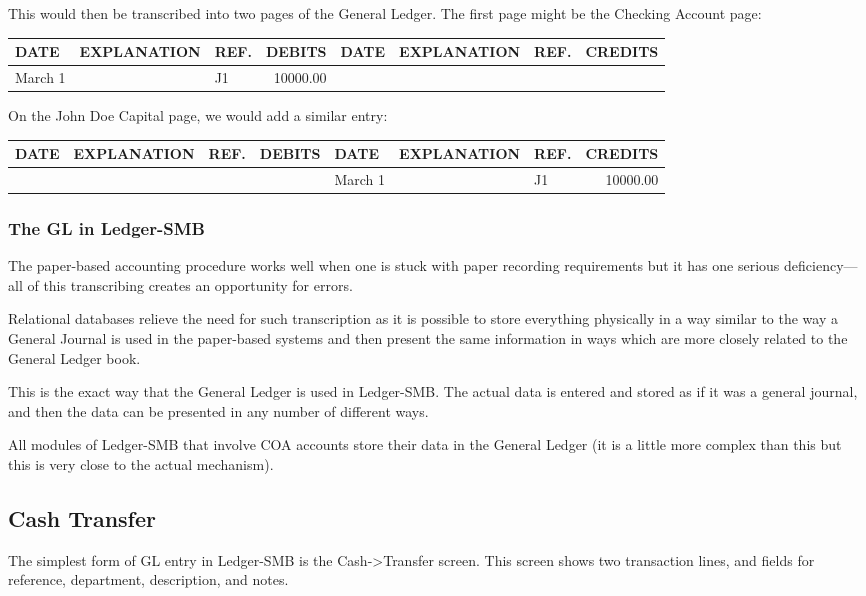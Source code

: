 \documentclass{article}
\begin{document}
This would then be transcribed into two pages of the General Ledger.  The first
page might be the Checking Account page:\medskip

\begin{tabular}{|l|l|l|r|l|l|l|r|}
\hline
DATE & EXPLANATION & REF. & DEBITS & DATE & EXPLANATION & REF. & CREDITS\\
\hline
March 1 & & J1 & 10000.00 & & & & \\
\hline
\end{tabular}\medskip

On the John Doe Capital page, we would add a similar entry:\medskip

\begin{tabular}{|l|l|l|r|l|l|l|r|}
\hline
DATE & EXPLANATION & REF. & DEBITS & DATE & EXPLANATION & REF. & CREDITS\\
\hline
 & & & & March 1 & & J1 & 10000.00\\
\hline
\end{tabular}\medskip

\subsubsection{The GL in Ledger-SMB}

The paper-based accounting procedure works well when one is stuck with paper
recording requirements but it has one serious deficiency--- all of this
transcribing creates an opportunity for errors.

Relational databases relieve the need for such transcription as it is possible
to store everything physically in a way similar to the way a General Journal is
used in the paper-based systems and then present the same information in ways
which are more closely related to the General Ledger book.

This is the exact way that the General Ledger is used in Ledger-SMB.  The actual
data is entered and stored as if it was a general journal, and then the data can
be presented in any number of different ways.

All modules of Ledger-SMB that involve COA accounts store their data in the
General Ledger (it is a little more complex than this but this is very close to
the actual mechanism).

\subsection{Cash Transfer}
The simplest form of GL entry in Ledger-SMB is the Cash-\textgreater Transfer
screen.  This screen shows two transaction lines, and fields for reference,
department, description, and notes.
\end{document}
